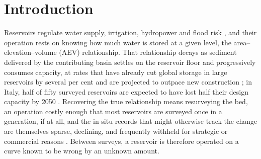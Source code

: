 \section{Introduction}
\label{sec:intro}

Reservoirs regulate water supply, irrigation, hydropower and flood risk
\citep{Pokhrel2021}, and their operation rests on knowing how much water is stored at a
given level, the area--elevation--volume (AEV) relationship. That relationship decays as
sediment delivered by the contributing basin settles on the reservoir floor and
progressively consumes capacity, at rates that have already cut global storage in large
reservoirs by several per cent and are projected to outpace new construction
\citep{Wisser2013}; in Italy, half of fifty surveyed reservoirs are expected to have lost
half their design capacity by 2050 \citep{Patro2022}. Recovering the true relationship
means resurveying the bed, an operation costly enough that most reservoirs are surveyed
once in a generation, if at all, and the in-situ records that might otherwise track the
change are themselves sparse, declining, and frequently withheld for strategic or
commercial reasons \citep{BuskerEtAl2019, Zhang2026}. Between surveys, a reservoir is
therefore operated on a curve known to be wrong by an unknown amount.

